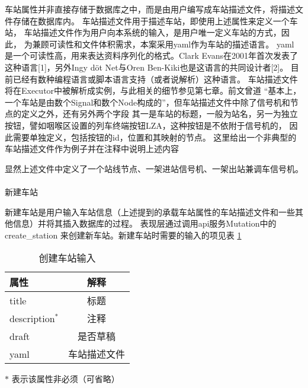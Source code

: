 车站属性并非直接存储于数据库之中，而是由用户编写成车站描述文件，将描述文件存储在数据库内。
车站描述文件用于描述车站，即使用上述属性来定义一个车站，
车站描述文件作为用户向本系统的输入，是用户唯一定义车站的方式，因此，
为兼顾可读性和文件体积需求，本案采用yaml作为车站的描述语言。
yaml 是一个可读性高，用来表达资料序列化的格式。Clark Evans在2001年首次发表了这种语言[1]，另外Ingy döt Net与Oren Ben-Kiki也是这语言的共同设计者[2]。
目前已经有数种编程语言或脚本语言支持（或者说解析）这种语言。
车站描述文件将在Executor中被解析成实例，与此相关的细节参见第七章。前文曾道
“基本上，一个车站是由数个Signal和数个Node构成的”，但车站描述文件中除了信号机和节点的定义之外，还有另外两个字段
其一是车站的标题，一般为站名，另一为独立按钮，譬如咽喉区设置的列车终端按钮LZA，这种按钮是不依附于信号机的，
因此需要单独定义，包括按钮的id，位置和其映射的节点。
这里给出一个非典型的车站描述文件作为例子并在注释中说明上述内容

显然上述文件中定义了一个站线节点、一架进站信号机、一架出站兼调车信号机。

\paragraph{}新建车站

新建车站是用户输入车站信息（上述提到的承载车站属性的车站描述文件和一些其他信息）并将其插入数据库的过程。
表现层通过调用api服务Mutation中的 create\_station 来创建新车站。新建车站时需要的输入的项见表 \ref{create_sta_in}

\begin{table}[htpb!]
    \centering
    \caption{\label{create_sta_in}创建车站输入}
    \begin{threeparttable}
        \begin{tabular}{lc}
            \toprule
            属性            & 解释         \\
            \midrule
            title           & 标题         \\
            description$^*$ & 注释         \\
            draft           & 是否草稿     \\
            yaml            & 车站描述文件 \\
            \bottomrule
        \end{tabular}
        \begin{tablenotes}
            \footnotesize
            \item[$*$] 表示该属性非必须（可省略）
        \end{tablenotes}
    \end{threeparttable}
\end{table}

